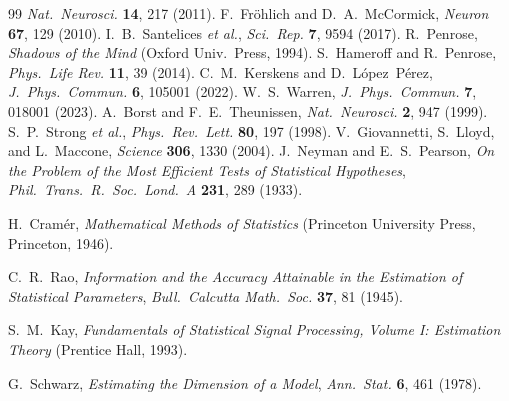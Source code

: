\documentclass[twocolumn,10pt]{article}
\begin{document}
\begin{thebibliography}{99}
\textit{Nat.\ Neurosci.} \textbf{14}, 217 (2011).
 F.~Fr\"ohlich and D.~A.~McCormick,
\textit{Neuron} \textbf{67}, 129 (2010).
 I.~B.~Santelices \textit{et al.},
\textit{Sci.\ Rep.} \textbf{7}, 9594 (2017).
 R.~Penrose, \textit{Shadows of the Mind} (Oxford
Univ.\ Press, 1994).
 S.~Hameroff and R.~Penrose,
\textit{Phys.\ Life Rev.} \textbf{11}, 39 (2014).
 C.~M.~Kerskens and D.~L\'opez~P\'erez,
\textit{J.\ Phys.\ Commun.} \textbf{6}, 105001 (2022).
 W.~S.~Warren,
\textit{J.\ Phys.\ Commun.} \textbf{7}, 018001 (2023).
 A.~Borst and F.~E.~Theunissen,
\textit{Nat.\ Neurosci.} \textbf{2}, 947 (1999).
 S.~P.~Strong \textit{et al.},
\textit{Phys.\ Rev.\ Lett.} \textbf{80}, 197 (1998).
 V.~Giovannetti, S.~Lloyd, and L.~Maccone,
\textit{Science} \textbf{306}, 1330 (2004).
J.~Neyman and E.~S.~Pearson,
\textit{On the Problem of the Most Efficient Tests of Statistical Hypotheses},
\textit{Phil.\ Trans.\ R.\ Soc.\ Lond.\ A} \textbf{231}, 289 (1933).

H.~Cramér,
\textit{Mathematical Methods of Statistics}
(Princeton University Press, Princeton, 1946).

C.~R.~Rao,
\textit{Information and the Accuracy Attainable in the Estimation of
Statistical Parameters},
\textit{Bull.\ Calcutta Math.\ Soc.} \textbf{37}, 81 (1945).

S.~M.~Kay,
\textit{Fundamentals of Statistical Signal Processing, Volume I:
Estimation Theory}
(Prentice Hall, 1993).

G.~Schwarz,
\textit{Estimating the Dimension of a Model},
\textit{Ann.\ Stat.} \textbf{6}, 461 (1978).
\end{thebibliography}
\end{document}
